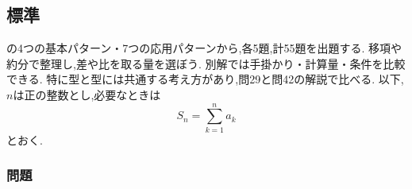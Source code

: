 
\subsection{標準}\label{節：標準}
の4つの基本パターン・7つの応用パターンから,各5題,計55題を出題する.
移項や約分で整理し,差や比を取る量を選ぼう.
別解では手掛かり・計算量・条件を比較できる.
特に型と型には共通する考え方があり,問29と問42の解説で比べる.
以下,$n$は正の整数とし,必要なときは
\[
  S_n=\sum_{k=1}^{n}a_k
\]
とおく.

\subsubsection{問題}\label{節：標準：問題}
